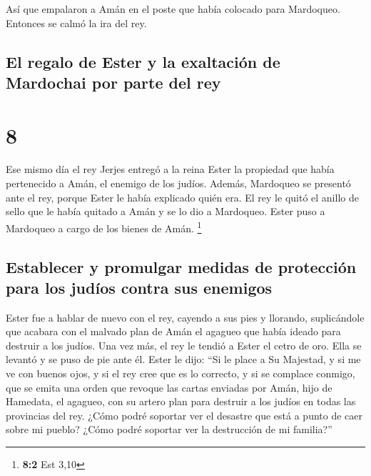  Así que empalaron a Amán en el poste que había colocado
para Mardoqueo. Entonces se calmó la ira del rey.

\hypertarget{el-regalo-de-ester-y-la-exaltaciuxf3n-de-mardochai-por-parte-del-rey}{%
\subsection{El regalo de Ester y la exaltación de Mardochai por parte
del
rey}\label{el-regalo-de-ester-y-la-exaltaciuxf3n-de-mardochai-por-parte-del-rey}}

\hypertarget{section-7}{%
\section{8}\label{section-7}}

 Ese mismo día el rey Jerjes entregó a la reina Ester la
propiedad que había pertenecido a Amán, el enemigo de los judíos.
Además, Mardoqueo se presentó ante el rey, porque Ester le había
explicado quién era.  El rey le quitó el anillo de sello
que le había quitado a Amán y se lo dio a Mardoqueo. Ester puso a
Mardoqueo a cargo de los bienes de Amán. \footnote{\textbf{8:2} Est 3,10}

\hypertarget{establecer-y-promulgar-medidas-de-protecciuxf3n-para-los-juduxedos-contra-sus-enemigos}{%
\subsection{Establecer y promulgar medidas de protección para los judíos
contra sus
enemigos}\label{establecer-y-promulgar-medidas-de-protecciuxf3n-para-los-juduxedos-contra-sus-enemigos}}

 Ester fue a hablar de nuevo con el rey, cayendo a sus
pies y llorando, suplicándole que acabara con el malvado plan de Amán el
agagueo que había ideado para destruir a los judíos.  Una
vez más, el rey le tendió a Ester el cetro de oro. Ella se levantó y se
puso de pie ante él.  Ester le dijo: ``Si le place a Su
Majestad, y si me ve con buenos ojos, y si el rey cree que es lo
correcto, y si se complace conmigo, que se emita una orden que revoque
las cartas enviadas por Amán, hijo de Hamedata, el agagueo, con su
artero plan para destruir a los judíos en todas las provincias del rey.
 ¿Cómo podré soportar ver el desastre que está a punto de
caer sobre mi pueblo? ¿Cómo podré soportar ver la destrucción de mi
familia?''

